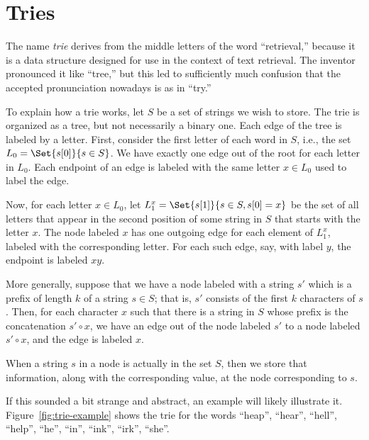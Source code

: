 \section{Tries}
The name \emph{trie} derives from the middle letters of the word
``retrieval,'' because it is a data structure designed for use in the
context of text retrieval. The inventor pronounced it like ``tree,''
but this led to sufficiently much confusion that the accepted
pronunciation nowadays is as in ``try.''

To explain how a trie works, let $S$ be a set of strings we wish to
store. The trie is organized as a tree, but not necessarily a binary
one. Each edge of the tree is labeled by a letter. 
First, consider the first letter of each word in $S$, i.e., the set
$L_0 = \Set{s[0]}{s \in S}$. 
We have exactly one edge out of the root for each letter in $L_0$.
Each endpoint of an edge is labeled with the same letter $x \in L_0$
used to label the edge.

Now, for each letter $x \in L_0$, let $L_1^x = \Set{s[1]}{s \in S,
  s[0] = x}$ be the set of all letters that appear in the second
position of some string in $S$ that starts with the letter $x$. 
The node labeled $x$ has one outgoing edge for each element of
$L_1^x$, labeled with the corresponding letter. For each such edge,
say, with label $y$, the endpoint is labeled $xy$.

More generally, suppose that we have a node labeled with a string
$s'$ which is a prefix of length $k$ of a string $s \in S$; that is,
$s'$ consists of the first $k$ characters of $s$. 
Then, for each character $x$ such that there is a string in $S$ whose
prefix is the concatenation $s' \circ x$, we have an edge out of
the node labeled $s'$ to a node labeled $s' \circ x$, and the edge is
labeled $x$. 

When a string $s$ in a node is actually in the set $S$, then we store
that information, along with the corresponding value, at the node
corresponding to $s$. 

If this sounded a bit strange and abstract, an example will likely
illustrate it. Figure~\ref{fig:trie-example} shows the trie for the
words ``heap'', ``hear'', ``hell'', ``help'', ``he'', ``in'',
``ink'', ``irk'', ``she''.

